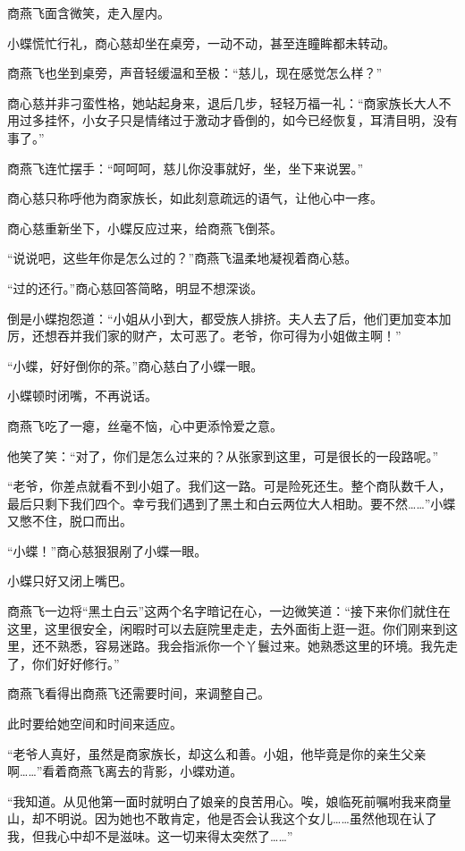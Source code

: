 
\begin{this_body}

商燕飞面含微笑，走入屋内。

小蝶慌忙行礼，商心慈却坐在桌旁，一动不动，甚至连瞳眸都未转动。

商燕飞也坐到桌旁，声音轻缓温和至极：“慈儿，现在感觉怎么样？”

商心慈并非刁蛮性格，她站起身来，退后几步，轻轻万福一礼：“商家族长大人不用过多挂怀，小女子只是情绪过于激动才昏倒的，如今已经恢复，耳清目明，没有事了。”

商燕飞连忙摆手：“呵呵呵，慈儿你没事就好，坐，坐下来说罢。”

商心慈只称呼他为商家族长，如此刻意疏远的语气，让他心中一疼。

商心慈重新坐下，小蝶反应过来，给商燕飞倒茶。

“说说吧，这些年你是怎么过的？”商燕飞温柔地凝视着商心慈。

“过的还行。”商心慈回答简略，明显不想深谈。

倒是小蝶抱怨道：“小姐从小到大，都受族人排挤。夫人去了后，他们更加变本加厉，还想吞并我们家的财产，太可恶了。老爷，你可得为小姐做主啊！”

“小蝶，好好倒你的茶。”商心慈白了小蝶一眼。

小蝶顿时闭嘴，不再说话。

商燕飞吃了一瘪，丝毫不恼，心中更添怜爱之意。

他笑了笑：“对了，你们是怎么过来的？从张家到这里，可是很长的一段路呢。”

“老爷，你差点就看不到小姐了。我们这一路。可是险死还生。整个商队数千人，最后只剩下我们四个。幸亏我们遇到了黑土和白云两位大人相助。要不然……”小蝶又憋不住，脱口而出。

“小蝶！”商心慈狠狠剐了小蝶一眼。

小蝶只好又闭上嘴巴。

商燕飞一边将“黑土白云”这两个名字暗记在心，一边微笑道：“接下来你们就住在这里，这里很安全，闲暇时可以去庭院里走走，去外面街上逛一逛。你们刚来到这里，还不熟悉，容易迷路。我会指派你一个丫鬟过来。她熟悉这里的环境。我先走了，你们好好修行。”

商燕飞看得出商燕飞还需要时间，来调整自己。

此时要给她空间和时间来适应。

“老爷人真好，虽然是商家族长，却这么和善。小姐，他毕竟是你的亲生父亲啊……”看着商燕飞离去的背影，小蝶劝道。

“我知道。从见他第一面时就明白了娘亲的良苦用心。唉，娘临死前嘱咐我来商量山，却不明说。因为她也不敢肯定，他是否会认我这个女儿……虽然他现在认了我，但我心中却不是滋味。这一切来得太突然了……”


\end{this_body}
